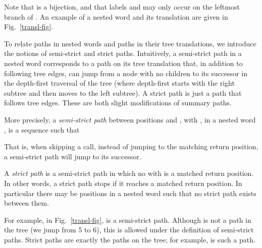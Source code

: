\documentclass{LMCS}
\theoremstyle{plain}
\theoremstyle{definition}
\newcounter{example}
\begin{document}
Note that 
is a bijection, and that labels  and  may only occur on
the leftmost branch of . An example of a nested word and its
translation are given in Fig.~\ref{transl-fig}.

To relate paths in nested words and paths in their tree translations,
we introduce the notions of semi-strict and strict paths. Intuitively,
a semi-strict path in a nested word corresponds to a path on
its tree translation that, in addition to following tree edges, can
jump from a node with no children to its successor in the depth-first
traversal of the tree (where depth-first starts with the right subtree
and then moves to the left subtree). A strict path is just a
path that follows tree edges.  These are both slight modifications of
summary paths.

More precisely, 
a {\em semi-strict path}
between positions  and , with , in a nested word , is
a sequence  such that

That is, when skipping a call, instead of jumping to the matching return
position, a semi-strict path will jump to its successor. 

A {\em strict path} is a semi-strict path  in which no  with  is a
matched return position. In other words, a strict path stops if it
reaches a matched return position. In particular there may be positions  in a nested word such that no strict path exists between
them.  

For example, in Fig.~\ref{transl-fig},  is a
semi-strict path. Although  is not a path in
the tree (we jump from 5 to 6), this is allowed under the definition
of semi-strict paths. Strict paths are exactly the paths on the
tree; for example,  is such a path.
\end{document}
